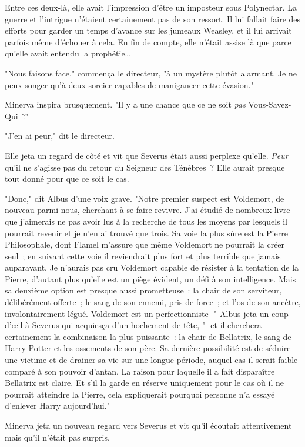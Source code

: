 Entre ces deux-là, elle avait l'impression d'être un imposteur sous Polynectar. La guerre et l'intrigue n'étaient certainement pas de son ressort. Il lui fallait faire des efforts pour garder un temps d'avance sur les jumeaux Weasley, et il lui arrivait parfois même d'échouer à cela. En fin de compte, elle n'était assise là que parce qu'elle avait entendu la prophétie…

"Nous faisons face," commença le directeur, "à un mystère plutôt alarmant. Je ne peux songer qu'à deux sorcier capables de manigancer cette évasion."

Minerva inspira brusquement. "Il y a une chance que ce ne soit \emph{pas} Vous-Savez-Qui~?"

"J'en ai peur," dit le directeur.

Elle jeta un regard de côté et vit que Severus était aussi perplexe qu'elle. \emph{Peur} qu'il ne s'agisse pas du retour du Seigneur des Ténèbres~? Elle aurait presque tout donné pour que ce soit le cas.

"Donc," dit Albus d'une voix grave. "Notre premier suspect est Voldemort, de nouveau parmi nous, cherchant à se faire revivre. J'ai étudié de nombreux livre que j'aimerais ne pas avoir lus à la recherche de tous les moyens par lesquels il pourrait revenir et je n'en ai trouvé que trois. Sa voie la plus sûre est la Pierre Philosophale, dont Flamel m'assure que même Voldemort ne pourrait la créer seul~; en suivant cette voie il reviendrait plus fort et plus terrible que jamais auparavant. Je n'aurais pas cru Voldemort capable de résister à la tentation de la Pierre, d'autant plus qu'elle est un piège évident, un défi à son intelligence. Mais sa deuxième option est presque aussi prometteuse~: la chair de son serviteur, délibérément offerte~; le sang de son ennemi, pris de force~; et l'os de son ancêtre, involontairement légué. Voldemort est un perfectionniste -" Albus jeta un coup d'œil à Severus qui acquiesça d'un hochement de tête, "- et il cherchera certainement la combinaison la plus puissante~: la chair de Bellatrix, le sang de Harry Potter et les ossements de son père. Sa dernière possibilité est de séduire une victime et de drainer sa vie sur une longue période, auquel cas il serait faible comparé à son pouvoir d'antan. La raison pour laquelle il a fait disparaître Bellatrix est claire. Et s'il la garde en réserve uniquement pour le cas où il ne pourrait atteindre la Pierre, cela expliquerait pourquoi personne n'a essayé d'enlever Harry aujourd'hui."

Minerva jeta un nouveau regard vers Severus et vit qu'il écoutait attentivement mais qu'il n'était pas surpris.

